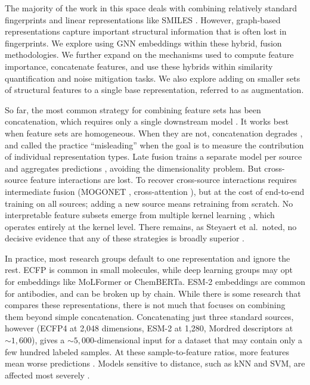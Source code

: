 The majority of the work in this space deals with combining relatively standard fingerprints and linear representations like SMILES \citep{Xie2020, Laufktter2019}. However, graph-based representations capture important structural information that is often lost in fingerprints. We explore using GNN embeddings within these hybrid, fusion methodologies. We further expand on the mechanisms used to compute feature importance, concatenate features, and use these hybrids within similarity quantification and noise mitigation tasks. We also explore adding on smaller sets of structural features to a single base representation, referred to as augmentation. 

So far, the most common strategy for combining feature sets has been concatenation, which requires only a single downstream model \citep{Stahlschmidt2022}. It works best when feature sets are homogeneous. When they are not, concatenation degrades \citep{Stahlschmidt2022}, and \cite{Deng2023} called the practice ``misleading'' when the goal is to measure the contribution of individual representation types. Late fusion trains a separate model per source and aggregates predictions \citep{Steyaert2023}, avoiding the dimensionality problem. But cross-source feature interactions are lost. To recover cross-source interactions requires intermediate fusion (MOGONET \citep{Wang2021}, cross-attention \citep{Zhang2024}), but at the cost of end-to-end training on all sources; adding a new source means retraining from scratch. No interpretable feature subsets emerge from multiple kernel learning \citep{Gonen2011}, which operates entirely at the kernel level. There remains, as Steyaert et al.\ noted, no decisive evidence that any of these strategies is broadly superior \citep{Steyaert2023}.

In practice, most research groups default to one representation and ignore the rest. ECFP is common in small molecules, while deep learning groups may opt for embeddings like MoLFormer or ChemBERTa. ESM-2 embeddings are common for antibodies, and can be broken up by chain. While there is some research that compares these representations, there is not much that focuses on combining them beyond simple concatenation. Concatenating just three standard sources, however (ECFP4 at 2,048 dimensions, ESM-2 at 1,280, Mordred descriptors at ${\sim}1{,}600$), gives a ${\sim}5{,}000$-dimensional input for a dataset that may contain only a few hundred labeled samples. At these sample-to-feature ratios, more features mean worse predictions \citep{Hughes1968, Bellman1961}. Models sensitive to distance, such as kNN and SVM, are affected most severely \citep{FernandezDelgado2014}.

